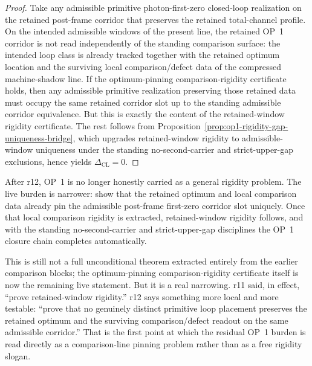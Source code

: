 \begin{proof}
Take any admissible primitive photon-first-zero closed-loop realization on the retained post-frame corridor that preserves the retained total-channel profile. On the intended admissible windows of the present line, the retained OP~1 corridor is not read independently of the standing comparison surface: the intended loop class is already tracked together with the retained optimum location and the surviving local comparison/defect data of the compressed machine-shadow line. If the optimum-pinning comparison-rigidity certificate holds, then any admissible primitive realization preserving those retained data must occupy the same retained corridor slot up to the standing admissible corridor equivalence. But this is exactly the content of the retained-window rigidity certificate. The rest follows from Proposition~\ref{prop:op1-rigidity-gap-uniqueness-bridge}, which upgrades retained-window rigidity to admissible-window uniqueness under the standing no-second-carrier and strict-upper-gap exclusions, hence yields \(\Delta_{\mathrm{CL}}=0\).
\end{proof}

\begin{corollary}
\label{cor:op1-live-burden-after-r12}
After r12, OP~1 is no longer honestly carried as a general rigidity problem. The live burden is narrower: show that the retained optimum and local comparison data already pin the admissible post-frame first-zero corridor slot uniquely. Once that local comparison rigidity is extracted, retained-window rigidity follows, and with the standing no-second-carrier and strict-upper-gap disciplines the OP~1 closure chain completes automatically.
\end{corollary}

\begin{remark}
This is still not a full unconditional theorem extracted entirely from the earlier comparison blocks; the optimum-pinning comparison-rigidity certificate itself is now the remaining live statement. But it is a real narrowing. r11 said, in effect, ``prove retained-window rigidity.'' r12 says something more local and more testable: ``prove that no genuinely distinct primitive loop placement preserves the retained optimum and the surviving comparison/defect readout on the same admissible corridor.'' That is the first point at which the residual OP~1 burden is read directly as a comparison-line pinning problem rather than as a free rigidity slogan.
\end{remark}

